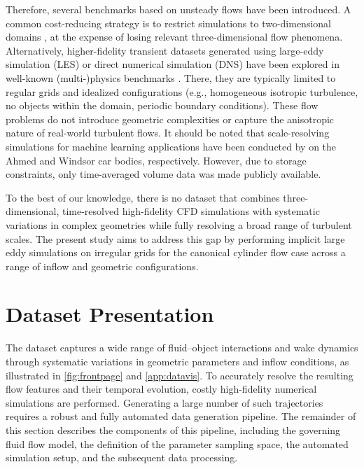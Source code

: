 \documentclass{article}
\begin{document}
Therefore, several benchmarks based on unsteady flows have been introduced. A common cost-reducing strategy is to restrict simulations to two-dimensional domains \citep{huang2020, Viquerat2020, Jakob2020, pfaff2021traditionalcylinder, han2022predictingphysicsmeshreducedspace, megaflow2d2023, eagle2023, flowbench2024, cfdbench2024, FluidGPT2025}, at the expense of losing relevant three-dimensional flow phenomena. Alternatively, higher-fidelity transient datasets generated using large-eddy simulation (LES) or direct numerical simulation (DNS) have been explored in well-known (multi-)physics benchmarks \citep{bubbleml2023, blastnet202023, apebench2024, takamoto2024pdebenchextensivebenchmarkscientific, thewell2025, realm2026}. There, they are typically limited to regular grids and idealized configurations (e.g., homogeneous isotropic turbulence, no objects within the domain, periodic boundary conditions). These flow problems do not introduce geometric complexities or capture the anisotropic nature of real-world turbulent flows. It should be noted that scale-resolving simulations for machine learning applications have been conducted by \citet{ahmedml2024, windsorml2025} on the Ahmed and Windsor car bodies, respectively. However, due to storage constraints, only time-averaged volume data was made publicly available.

To the best of our knowledge, there is no dataset that combines three-dimensional, time-resolved high-fidelity CFD simulations with systematic variations in complex geometries while fully resolving a broad range of turbulent scales. The present study aims to address this gap by performing implicit large eddy simulations on irregular grids for the canonical cylinder flow case across a range of inflow and geometric configurations.


\section{Dataset Presentation}
The dataset captures a wide range of fluid--object interactions and wake dynamics through systematic variations in geometric parameters and inflow conditions\textcolor{revcolor}{, as illustrated in \autoref{fig:frontpage} and \autoref{app:datavis}}. To accurately resolve the resulting flow features and their temporal evolution, costly high-fidelity numerical simulations are performed. Generating a large number of such trajectories requires a robust and fully automated data generation pipeline. The remainder of this section describes the components of this pipeline, including the governing fluid flow model, the definition of the parameter sampling space, the automated simulation setup, and the subsequent data processing.
\end{document}
